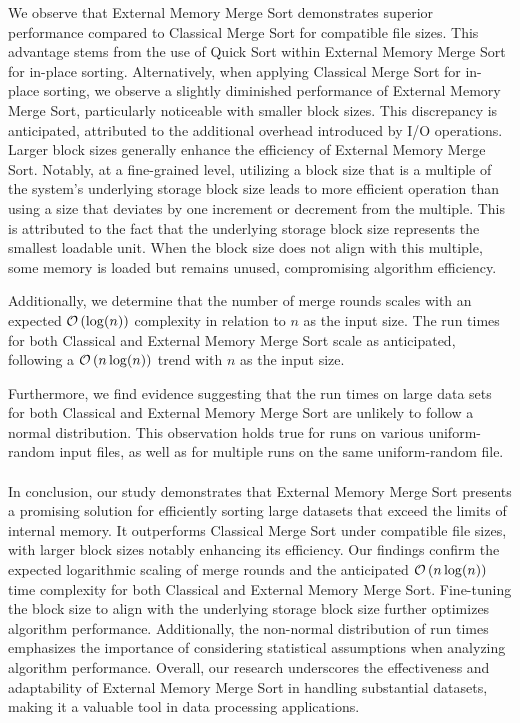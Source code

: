 \documentclass[twocolumn]{article}
\begin{document}
We observe that External Memory Merge Sort demonstrates superior performance compared to Classical Merge Sort for compatible file sizes.
This advantage stems from the use of Quick Sort within External Memory Merge Sort for in-place sorting. Alternatively, when applying Classical Merge Sort for in-place sorting,
we observe a slightly diminished performance of External Memory Merge Sort, particularly noticeable with smaller block sizes. This discrepancy is anticipated, attributed to the
additional overhead introduced by I/O operations.
Larger block sizes generally enhance the efficiency of External Memory Merge Sort. Notably, at a fine-grained level, utilizing a block size that is a multiple of the
system's underlying storage block size leads to more efficient operation than using a size that deviates by one increment or decrement from the multiple.
This is attributed to the fact that the underlying storage block size represents the smallest loadable unit.
When the block size does not align with this multiple, some memory is loaded but remains unused, compromising algorithm efficiency.

Additionally, we determine that the number of merge rounds scales with an expected \( \mathcal{O} \mathop{}\!\left (\log(n) \mathop{}\!\right ) \) complexity in relation to \( n \) as the input size.
The run times for both Classical and External Memory Merge Sort scale as anticipated, following a \( \mathcal{O} \mathop{}\!\left (n\log(n) \mathop{}\!\right ) \) trend with \( n \) as the input size.

Furthermore, we find evidence suggesting that the run times on large data sets for both Classical and External Memory Merge Sort are unlikely to follow a normal distribution.
This observation holds true for runs on various uniform-random input files, as well as for multiple runs on the same uniform-random file.

\paragraph{}
In conclusion, our study demonstrates that External Memory Merge Sort presents a promising solution for efficiently sorting large datasets that exceed the limits of internal memory.
It outperforms Classical Merge Sort under compatible file sizes, with larger block sizes notably enhancing its efficiency.
Our findings confirm the expected logarithmic scaling of merge rounds and the anticipated \( \mathcal{O} \mathop{}\!\left (n\log(n) \mathop{}\!\right ) \) time complexity for both Classical and External Memory Merge Sort.
Fine-tuning the block size to align with the underlying storage block size further optimizes algorithm performance.
Additionally, the non-normal distribution of run times emphasizes the importance of considering statistical assumptions when analyzing algorithm performance.
Overall, our research underscores the effectiveness and adaptability of External Memory Merge Sort in handling substantial datasets, making it a valuable tool in data processing applications.
\end{document}
